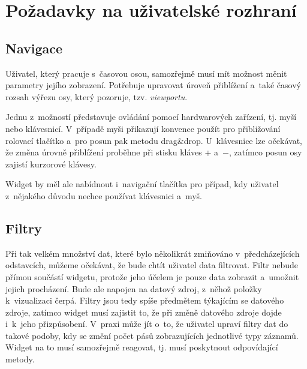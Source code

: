 		
	\section{Požadavky na uživatelské rozhraní}
		\label{pozadavky-na-uzivatelske-rozhrani}
		
		\subsection*{Navigace}
			\label{navigace}
			Uživatel, který pracuje s~časovou osou, samozřejmě musí mít možnost měnit parametry jejího zobrazení. Potřebuje upravovat úroveň přiblížení a~také časový rozsah výřezu osy, který pozoruje, tzv. \emph{viewportu}.
			
			Jednu z~možností představuje ovládání pomocí hardwarových zařízení, tj. myší nebo klávesnicí. V~případě myši přikazují konvence použít pro přibližování rolovací tlačítko a~pro posun pak metodu drag\&drop. U~klávesnice lze očekávat, že změna úrovně přiblížení proběhne při stisku kláves {\sf +} a~{\sf $-$}, zatímco posun osy zajistí kurzorové klávesy.
			
			Widget by měl ale nabídnout i~navigační tlačítka pro případ, kdy uživatel z~nějakého důvodu nechce používat klávesnici a~myš.
			
		\subsection*{Filtry}
			\label{filtry}
			Při tak velkém množství dat, které bylo několikrát zmiňováno v~předcházejících odstavcích, můžeme očekávat, že bude chtít uživatel data filtrovat. Filtr nebude přímou součástí widgetu, protože jeho účelem je pouze data zobrazit a~umožnit jejich procházení. Bude ale napojen na datový zdroj, z~něhož položky k~vizualizaci čerpá. Filtry jsou tedy spíše předmětem týkajícím se datového zdroje, zatímco widget musí zajistit to, že při změně datového zdroje dojde i~k~jeho přizpůsobení. V~praxi může jít o~to, že uživatel upraví filtry dat do takové podoby, kdy se změní počet pásů zobrazujících jednotlivé typy záznamů. Widget na to musí samozřejmě reagovat, tj. musí poskytnout odpovídající metody.
			

